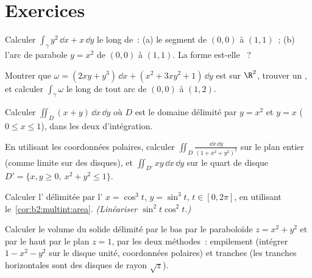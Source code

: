 \section{Exercices}

\begin{exercise}[$\star$]\label{exo:b2:multint:1}
Calculer $\int_\gamma y^2\,\dd x + x\,\dd y$ le long de~: (a) le segment
de $(0,0)$ à $(1,1)$~; (b) l'arc de parabole $y = x^2$ de
$(0,0)$ à $(1,1)$. La forme est-elle ~?
\end{exercise}

\begin{exercise}[$\star$]\label{exo:b2:multint:2}
Montrer que $\omega = (2xy + y^3)\,\dd x + (x^2 + 3xy^2 + 1)\,\dd y$
est  sur $\R^2$, trouver un , et calculer
$\int_\gamma\omega$ le long de tout arc de $(0, 0)$ à $(1, 2)$.
\end{exercise}

\begin{exercise}[$\star$]\label{exo:b2:multint:3}
Calculer $\iint_D (x + y)\,\dd x\,\dd y$ où $D$ est le domaine
délimité par $y = x^2$ et $y = x$ ($0 \leq x \leq 1$), dans les deux
 d'intégration.
\end{exercise}

\begin{exercise}[$\star\star$]\label{exo:b2:multint:4}
En utilisant les coordonnées polaires, calculer $\iint_D \frac{\dd x\,\dd y}{(1 +
x^2 + y^2)^2}$ sur le plan entier (comme limite sur des disques), et
$\iint_{D'} xy\,\dd x\,\dd y$ sur le quart de disque $D' = \{x, y
\geq 0,\ x^2 + y^2 \leq 1\}$.
\end{exercise}

\begin{exercise}[$\star\star$]\label{exo:b2:multint:5}
Calculer l' délimitée par l' $x = \cos^3 t$, $y =
\sin^3 t$, $t \in [0, 2\pi]$, en utilisant
le~\cref{cor:b2:multint:area}. \emph{(Linéariser $\sin^2 t\cos^2 t$.)}
\end{exercise}

\begin{exercise}[$\star\star$]\label{exo:b2:multint:6}
Calculer le volume du solide délimité par le bas par le paraboloïde $z
= x^2 + y^2$ et par le haut par le plan $z = 1$, par les deux méthodes~:
empilement (intégrer $1 - x^2 - y^2$ sur le disque unité, coordonnées
polaires) et tranches (les tranches horizontales sont des disques de
rayon $\sqrt z$).
\end{exercise}


